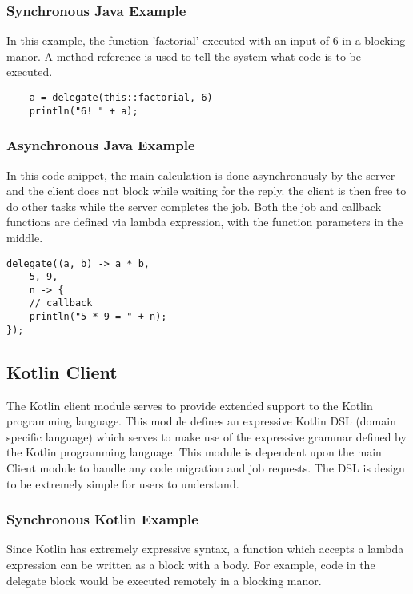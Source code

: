 \subsubsection{Synchronous Java Example}

In this example, the function 'factorial' executed with an input of 6
in a blocking manor.
A method reference is used to tell the system what
code is to be executed.

\begin{lstlisting}
    a = delegate(this::factorial, 6)
    println("6! " + a);
\end{lstlisting}

\subsubsection{Asynchronous Java Example}

In this code snippet, the main calculation is done asynchronously
by the server and the client does not block while waiting for the reply.
the client is then free to do other tasks while the server completes the job.
Both the job and callback functions are defined via lambda expression, with
the function parameters in the middle.

\begin{lstlisting}
delegate((a, b) -> a * b,
    5, 9,
    n -> {
    // callback
    println("5 * 9 = " + n);
});
\end{lstlisting}

\subsection{Kotlin Client}\label{subsec:kotlinClient}
The Kotlin client module serves to provide extended support to the Kotlin
programming language.
This module defines an expressive Kotlin DSL (domain specific language) which
serves to make use of the expressive grammar defined by the Kotlin programming language.
This module is dependent upon the main Client module to handle any code migration and job requests.
The DSL is design to be extremely simple for users to understand.

\subsubsection{Synchronous Kotlin Example}

Since Kotlin has extremely expressive syntax, a function which accepts a
lambda expression can be written as a block with a body.
For example, code in the delegate block would be executed remotely in a blocking manor.

